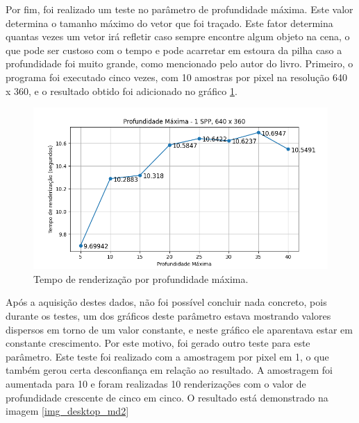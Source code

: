 \documentclass[journal]{IEEEtran}
\begin{document}
Por fim, foi realizado um teste no parâmetro de profundidade máxima. Este valor determina o tamanho máximo
do vetor que foi traçado. Este fator determina quantas vezes um vetor irá refletir caso sempre encontre algum
objeto na cena, o que pode ser custoso com o tempo e pode acarretar em estoura da pilha caso a profundidade
foi muito grande, como mencionado pelo autor do livro. Primeiro, o programa foi executado cinco vezes, com
10 amostras por pixel na resolução 640 x 360, e o resultado obtido foi adicionado no gráfico \ref{img_desktop_md1}.

\begin{figure}[ht]
  \centering
  \includegraphics[width=\linewidth]{media/Desktop_MD_1SPP.png}
  \caption{Tempo de renderização por profundidade máxima.}
  \label{img_desktop_md1}
\end{figure}

Após a aquisição destes dados, não foi possível concluir nada concreto, pois durante os testes, um dos gráficos
deste parâmetro estava mostrando valores dispersos em torno de um valor constante, e neste gráfico ele aparentava
estar em constante crescimento. Por este motivo, foi gerado outro teste para este parâmetro. Este teste foi realizado
com a amostragem por pixel em 1, o que também gerou certa desconfiança em relação ao resultado. A amostragem foi 
aumentada para 10 e foram realizadas 10 renderizações com o valor de profundidade crescente de cinco em cinco.
O resultado está demonstrado na imagem \ref{img_desktop_md2}
\end{document}
